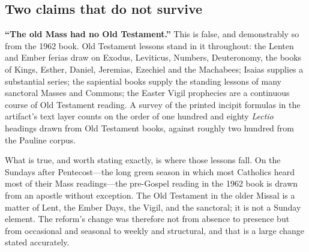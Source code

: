 \subsection{Two claims that do not survive}

\textbf{``The old Mass had no Old Testament.''} This is false, and demonstrably so from the 1962 book. Old Testament lessons stand in it throughout: the Lenten and Ember ferias draw on Exodus, Leviticus, Numbers, Deuteronomy, the books of Kings, Esther, Daniel, Jeremias, Ezechiel and the Machabees; Isaias supplies a substantial series; the sapiential books supply the standing lessons of many sanctoral Masses and Commons; the Easter Vigil prophecies are a continuous course of Old Testament reading. A survey of the printed incipit formulas in the artifact's text layer counts on the order of one hundred and eighty \emph{Lectio} headings drawn from Old Testament books, against roughly two hundred from the Pauline corpus.

What is true, and worth stating exactly, is where those lessons fall. On the Sundays after Pentecost---the long green season in which most Catholics heard most of their Mass readings---the pre-Gospel reading in the 1962 book is drawn from an apostle without exception. The Old Testament in the older Missal is a matter of Lent, the Ember Days, the Vigil, and the sanctoral; it is not a Sunday element. The reform's change was therefore not from absence to presence but from occasional and seasonal to weekly and structural, and that is a large change stated accurately.

